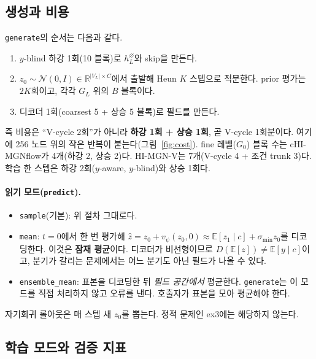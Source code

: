 \documentclass[11pt]{article}
\newcommand{\E}{\mathbb{E}}
\newcommand{\N}{\mathcal{N}}
\newcommand{\R}{\mathbb{R}}
\newcommand{\code}[1]{\texttt{#1}}
\begin{document}
\subsection{생성과 비용}\label{sec:chi-cost}

\code{generate}의 순서는 다음과 같다.
\begin{enumerate}
\item $y$-blind 하강 1회(10 블록)로 $h_L^{\varnothing}$와 skip을 만든다.
\item $z_0\sim\N(0,I)\in\R^{|V_L|\times C}$에서 출발해 Heun $K$ 스텝으로
  적분한다. prior 평가는 $2K$회이고, 각각 $G_L$ 위의 $B$ 블록이다.
\item 디코더 1회(coarsest 5 + 상승 5 블록)로 필드를 만든다.
\end{enumerate}
즉 비용은 ``V-cycle 2회''가 아니라 \textbf{하강 1회 + 상승 1회}, 곧 V-cycle
1회분이다. 여기에 256 노드 위의 작은 반복이 붙는다(그림~\ref{fig:cost}).
fine 레벨($G_0$) 블록 수는 cHI-MGNflow가 4개(하강 2, 상승 2)다. HI-MGN-V는
7개(V-cycle 4 + 조건 trunk 3)다. 학습 한 스텝은 하강 2회($y$-aware, $y$-blind)와
상승 1회다.

\paragraph{읽기 모드(\code{predict}).}
\begin{itemize}
\item \code{sample}(기본): 위 절차 그대로다.
\item \code{mean}: $t=0$에서 한 번 평가해 $\hat z = z_0 + v_\psi(z_0, 0) \approx
  \E[z_1\mid c] + \sigma_{\min}z_0$를 디코딩한다. 이것은 \textbf{잠재 평균}이다.
  디코더가 비선형이므로 $D(\E[z])\neq\E[y\mid c]$이고, 분기가 갈리는 문제에서는
  어느 분기도 아닌 필드가 나올 수 있다.
\item \code{ensemble\_mean}: 표본을 디코딩한 뒤 \emph{필드 공간에서} 평균한다.
  \code{generate}는 이 모드를 직접 처리하지 않고 오류를 낸다. 호출자가
  표본을 모아 평균해야 한다.
\end{itemize}
자기회귀 롤아웃은 매 스텝 새 $z_0$를 뽑는다. 정적 문제인 ex3에는 해당하지
않는다.

\subsection{학습 모드와 검증 지표}
\end{document}
